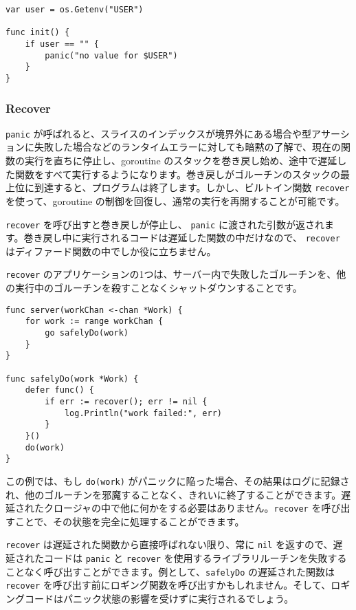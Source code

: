 \documentclass{jsarticle}
\begin{document}
\begin{lstlisting}[numbers=none]
var user = os.Getenv("USER")

func init() {
    if user == "" {
        panic("no value for $USER")
    }
}
\end{lstlisting}

\subsubsection{Recover}

\texttt{panic}
が呼ばれると、スライスのインデックスが境界外にある場合や型アサーションに失敗した場合などのランタイムエラーに対しても暗黙の了解で、現在の関数の実行を直ちに停止し、goroutine
のスタックを巻き戻し始め、途中で遅延した関数をすべて実行するようになります。巻き戻しがゴルーチンのスタックの最上位に到達すると、プログラムは終了します。しかし、ビルトイン関数
\texttt{recover} を使って、goroutine
の制御を回復し、通常の実行を再開することが可能です。

\texttt{recover} を呼び出すと巻き戻しが停止し、 \texttt{panic}
に渡された引数が返されます。巻き戻し中に実行されるコードは遅延した関数の中だけなので、
\texttt{recover} はディファード関数の中でしか役に立ちません。

\texttt{recover}
のアプリケーションの1つは、サーバー内で失敗したゴルーチンを、他の実行中のゴルーチンを殺すことなくシャットダウンすることです。

\begin{lstlisting}[numbers=none]
func server(workChan <-chan *Work) {
    for work := range workChan {
        go safelyDo(work)
    }
}

func safelyDo(work *Work) {
    defer func() {
        if err := recover(); err != nil {
            log.Println("work failed:", err)
        }
    }()
    do(work)
}
\end{lstlisting}

この例では、もし \texttt{do(work)}
がパニックに陥った場合、その結果はログに記録され、他のゴルーチンを邪魔することなく、きれいに終了することができます。遅延されたクロージャの中で他に何かをする必要はありません。\texttt{recover}
を呼び出すことで、その状態を完全に処理することができます。

\texttt{recover} は遅延された関数から直接呼ばれない限り、常に
\texttt{nil} を返すので、遅延されたコードは \texttt{panic} と
\texttt{recover}
を使用するライブラリルーチンを失敗することなく呼び出すことができます。例として、\texttt{safelyDo}
の遅延された関数は \texttt{recover}
を呼び出す前にロギング関数を呼び出すかもしれません。そして、ロギングコードはパニック状態の影響を受けずに実行されるでしょう。
\end{document}

